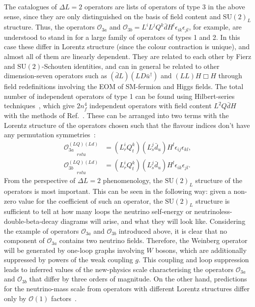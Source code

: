 The catalogues of $\Delta L = 2$ operators are lists of operators of type 3 in
the above sense, since they are only distinguished on the basis of field content
and $\mathrm{SU}(2)_{L}$ structure. Thus, the operators $\mathcal{O}_{3a}$ and
$\mathcal{O}_{3b} = L^{i}L^{j}Q^{k}\bar{d}H^{l} \epsilon_{ik}\epsilon_{jl}$, for
example, are understood to stand in for a large family of operators of types 1
and 2. In this case these differ in Lorentz structure (since the colour
contraction is unique), and almost all of them are linearly dependent. They are
related to each other by Fierz and $\mathrm{SU}(2)$-Schouten identities, and can
in general be related to other dimension-seven operators such as
$(\bar{d} L) (L D \bar{u}^{\dagger})$ and $(LL)H\Box H$ through field
redefinitions involving the EOM of SM-fermion and Higgs fields. The total number of
independent operators of type 1 can be found using Hilbert-series
techniques~\cite{Lehman:2015via, Henning:2015daa, Lehman:2015coa,
  Henning:2015alf, Henning:2017fpj}, which give $2n_{f}^{4}$ independent
operators with field content $L^{2} Q \bar{d} H$ with the methods of
Ref.~\cite{Henning:2015alf}. These can be arranged into two terms with the
Lorentz structure of the operators chosen such that the flavour indices don't
have any permutation symmetries~\cite{Lehman:2014jma}:
\begin{subequations}
  \label{eq:ch2-o3a3b-complete}
  \begin{align}
    \underset{rstu}{\mathcal{O}_{3a}^{(LQ)(Ld)}} &= (L^{i}_{r}Q^{k}_{t})(L^{j}_{s}\bar{d}_{u})H^{l} \epsilon_{ij} \epsilon_{kl},\\
    \underset{rstu}{\mathcal{O}_{3b}^{(LQ)(Ld)}} &= (L^{i}_{r}Q^{k}_{t})(L^{j}_{s}\bar{d}_{u})H^{l} \epsilon_{ik} \epsilon_{jl}.
  \end{align}
\end{subequations}
From the perspective of $\Delta L = 2$ phenomenology, the $\mathrm{SU}(2)_L$
structure of the operators is most important. This can be seen in the following
way: given a non-zero value for the coefficient of such an operator, the
$\mathrm{SU}(2)_{L}$ structure is sufficient to tell at how many loops the
neutrino self-energy or neutrinoless-double-beta-decay diagrams will arise, and
what they will look like. Considering the example of operators
$\mathcal{O}_{3a}$ and $\mathcal{O}_{3b}$ introduced above, it is clear that no
component of $\mathcal{O}_{3a}$ contains two neutrino fields. Therefore, the
Weinberg operator will be generated by one-loop graphs involving $W$ bosons,
which are additionally suppressed by powers of the weak coupling $g$. This
coupling and loop suppression leads to inferred values of the new-physics scale
characterising the operators $\mathcal{O}_{3a}$ and $\mathcal{O}_{3b}$ that
differ by three orders of magnitude. On the other hand, predictions for the
neutrino-mass scale from operators with different Lorentz structures differ only
by $\mathcal{O}(1)$ factors~\cite{deGouvea:2007qla}.

